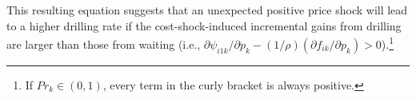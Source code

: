 This resulting equation suggests that an unexpected positive price shock will lead to a higher drilling rate if the cost-shock-induced incremental gains from drilling are larger than those from waiting (i.e., $\partial \psi_{i1k}/\partial p_{k} - (1/\rho)(\partial f_{ik}/\partial p_{k}) > 0$).\footnote{If $Pr_{k} \in (0, 1)$, every term in the curly bracket is always positive.}
